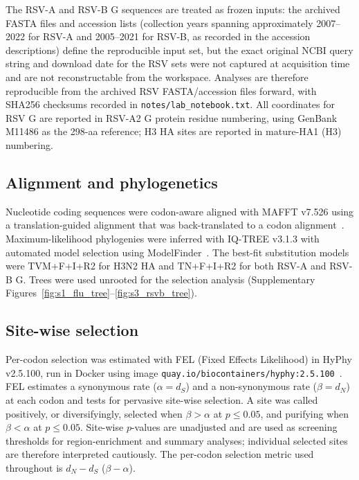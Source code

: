 \documentclass[11pt]{article}
\newcommand{\dndsdiff}{\ensuremath{d_N-d_S}}
\newcommand{\dn}{\ensuremath{d_N}}
\newcommand{\ds}{\ensuremath{d_S}}
\begin{document}
The RSV-A and RSV-B G sequences are treated as frozen inputs: the archived FASTA files and accession lists (collection years spanning approximately 2007--2022 for RSV-A and 2005--2021 for RSV-B, as recorded in the accession descriptions) define the reproducible input set, but the exact original NCBI query string and download date for the RSV sets were not captured at acquisition time and are not reconstructable from the workspace. Analyses are therefore reproducible from the archived RSV FASTA/accession files forward, with SHA256 checksums recorded in \texttt{notes/lab\_notebook.txt}. All coordinates for RSV G are reported in RSV-A2 G protein residue numbering, using GenBank M11486 as the 298-aa reference; H3 HA sites are reported in mature-HA1 (H3) numbering.

\subsection{Alignment and phylogenetics}

Nucleotide coding sequences were codon-aware aligned with MAFFT v7.526 using a translation-guided alignment that was back-translated to a codon alignment~\cite{katoh2013}. Maximum-likelihood phylogenies were inferred with IQ-TREE v3.1.3 with automated model selection using ModelFinder~\cite{minh2020,kalyaanamoorthy2017}. The best-fit substitution models were TVM+F+I+R2 for H3N2 HA and TN+F+I+R2 for both RSV-A and RSV-B G. Trees were used unrooted for the selection analysis (Supplementary Figures~\ref{fig:s1_flu_tree}--\ref{fig:s3_rsvb_tree}).

\subsection{Site-wise selection}

Per-codon selection was estimated with FEL (Fixed Effects Likelihood) in HyPhy v2.5.100, run in Docker using image \texttt{quay.io/biocontainers/hyphy:2.5.100}~\cite{kosakovsky2005fel,kosakovsky2005hyphy}. FEL estimates a synonymous rate ($\alpha=\ds$) and a non-synonymous rate ($\beta=\dn$) at each codon and tests for pervasive site-wise selection. A site was called positively, or diversifyingly, selected when $\beta>\alpha$ at $p\leq0.05$, and purifying when $\beta<\alpha$ at $p\leq0.05$. Site-wise $p$-values are unadjusted and are used as screening thresholds for region-enrichment and summary analyses; individual selected sites are therefore interpreted cautiously. The per-codon selection metric used throughout is \dndsdiff{} ($\beta-\alpha$).
\end{document}
